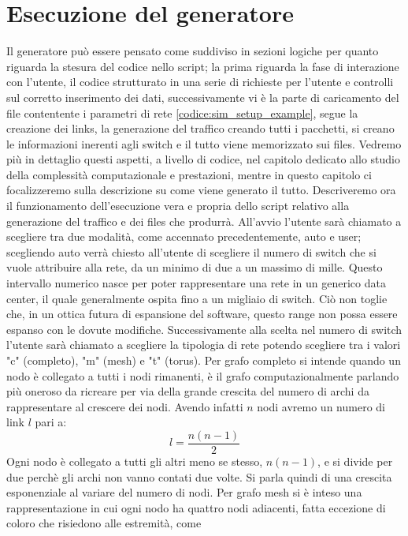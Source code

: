 \documentclass[binding=0.6cm]{sapthesis}
\begin{document}
\section{Esecuzione del generatore}
\label{sec:esecuzione_del_generatore}
Il generatore può essere pensato come suddiviso in sezioni logiche per quanto riguarda la stesura del codice nello script; la prima riguarda la fase
di interazione con l'utente, il codice  strutturato in una serie di richieste per l'utente e controlli sul corretto inserimento dei dati, successivamente
vi è la parte di caricamento del file contentente i parametri di rete \ref{codice:sim_setup_example}, segue la creazione dei links, la generazione del traffico
creando tutti i pacchetti, si creano le informazioni inerenti agli switch e il tutto viene memorizzato sui files. Vedremo più in dettaglio questi
aspetti, a livello di codice, nel capitolo dedicato allo studio della complessità computazionale e prestazioni, mentre in questo capitolo ci focalizzeremo
sulla descrizione su come viene generato il tutto.
Descriveremo ora il funzionamento dell'esecuzione vera e propria dello script relativo alla generazione del traffico e dei files che produrrà.
All'avvio l'utente sarà chiamato a scegliere tra due modalità, come accennato precedentemente, auto e user; scegliendo auto verrà chiesto all'utente
di scegliere il numero di switch che si vuole attribuire alla rete, da un minimo di due a un massimo di mille. Questo intervallo numerico nasce per
poter rappresentare una rete in un generico data center, il quale generalmente ospita fino a un migliaio di switch. Ciò non toglie che,
in un ottica futura di espansione del software, questo range non possa essere espanso con le dovute modifiche. Successivamente alla scelta nel numero
di switch l'utente sarà chiamato a scegliere la tipologia di rete potendo scegliere tra i valori "c" (completo), "m" (mesh) e "t" (torus). Per 
grafo completo
si intende quando un nodo è collegato a tutti i nodi rimanenti, è il grafo computazionalmente parlando più oneroso da ricreare per via 
della grande crescita
del numero di archi da rappresentare al crescere dei nodi. Avendo infatti \(n\) nodi avremo un numero di link \(l\) pari a:
\begin{equation}
    l = \frac{n(n-1)}{2}
    \label{eq:link_number}
\end{equation}
Ogni nodo è collegato a tutti gli altri meno se stesso, \(n(n-1)\), e si divide per due perchè gli archi non vanno contati due volte. Si parla quindi di una crescita esponenziale al variare del numero di nodi.
Per grafo mesh si è inteso una rappresentazione in cui ogni nodo ha quattro nodi adiacenti, fatta eccezione di coloro che risiedono alle estremità, come
\end{document}
